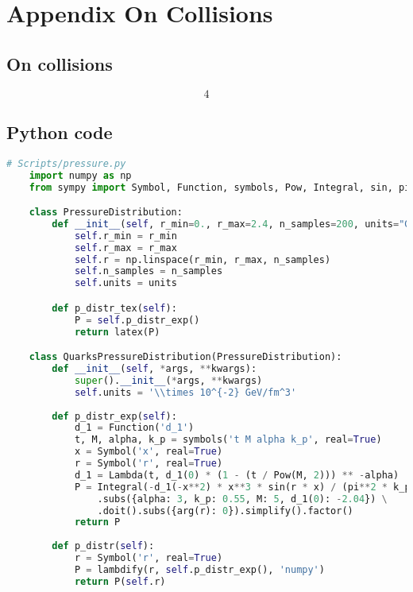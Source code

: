 \chapter{Appendix On Collisions}
\label{ch: appendix-collisions}

\section{On collisions}

\begin{equation}
4
\end{equation}

\section{Python code}



\renewcommand{\lstlistingname}{Fragmento de código}

\begin{lstlisting}[language=Python, caption=Python example, label=code:python_example]
    # Scripts/pressure.py
    import numpy as np
    from sympy import Symbol, Function, symbols, Pow, Integral, sin, pi, oo, lambdify

    class PressureDistribution:
        def __init__(self, r_min=0., r_max=2.4, n_samples=200, units="GeV/fm^3"):
            self.r_min = r_min
            self.r_max = r_max
            self.r = np.linspace(r_min, r_max, n_samples)
            self.n_samples = n_samples
            self.units = units

        def p_distr_tex(self):
            P = self.p_distr_exp()
            return latex(P)

    class QuarksPressureDistribution(PressureDistribution):
        def __init__(self, *args, **kwargs):
            super().__init__(*args, **kwargs)
            self.units = '\\times 10^{-2} GeV/fm^3'
    
        def p_distr_exp(self):
            d_1 = Function('d_1')
            t, M, alpha, k_p = symbols('t M alpha k_p', real=True)
            x = Symbol('x', real=True)
            r = Symbol('r', real=True)
            d_1 = Lambda(t, d_1(0) * (1 - (t / Pow(M, 2))) ** -alpha)
            P = Integral(-d_1(-x**2) * x**3 * sin(r * x) / (pi**2 * k_p * r), (x, 0, oo)) \
                .subs({alpha: 3, k_p: 0.55, M: 5, d_1(0): -2.04}) \
                .doit().subs({arg(r): 0}).simplify().factor()
            return P
    
        def p_distr(self):
            r = Symbol('r', real=True)
            P = lambdify(r, self.p_distr_exp(), 'numpy')
            return P(self.r) 
\end{lstlisting}